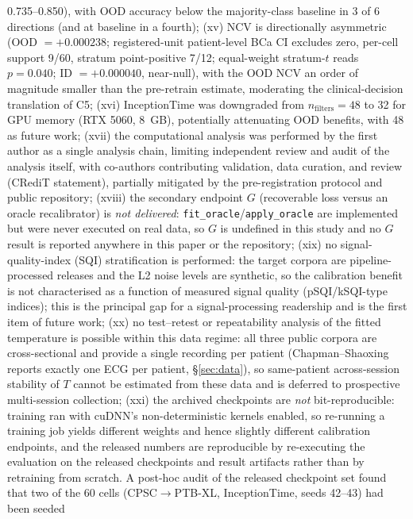 \documentclass[final,5p,times,nonatbib]{elsarticle}
\begin{document}
0.735--0.850), with OOD accuracy
below the majority-class baseline in 3 of 6 directions (and at baseline
in a fourth);
(xv) NCV is directionally asymmetric (OOD $= +0.000238$; registered-unit
patient-level BCa CI excludes zero, per-cell support 9/60, stratum
point-positive 7/12; equal-weight stratum-$t$ reads $p=0.040$;
ID $= +0.000040$, near-null), with the OOD NCV an order of
magnitude smaller than the pre-retrain estimate, moderating the
clinical-decision translation of C5; (xvi)
InceptionTime was downgraded from $n_{\text{filters}}=48$ to 32 for GPU
memory (RTX 5060, 8~GB), potentially attenuating OOD benefits, with 48
as future work; (xvii) the computational analysis was performed by the first
author as a single analysis chain, limiting independent review and
audit of the analysis itself, with co-authors contributing validation,
data curation, and review (CRediT statement), partially mitigated by
the pre-registration protocol and public repository; (xviii) the secondary
endpoint $G$ (recoverable loss versus an oracle recalibrator) is
\emph{not delivered}: \texttt{fit\_oracle}/\texttt{apply\_oracle} are
implemented but were never executed on real data, so $G$ is undefined in
this study and no $G$ result is reported anywhere in this paper or the
repository; (xix) no signal-quality-index (SQI) stratification is
performed: the target corpora are pipeline-processed releases and the L2
noise levels are synthetic, so the calibration benefit is not
characterised as a function of measured signal quality
(pSQI/kSQI-type indices); this is the principal gap for a
signal-processing readership and is the first item of future work;
(xx) no test--retest or repeatability analysis of the fitted temperature
is possible within this data regime: all three public corpora are
cross-sectional and provide a single recording per patient
(Chapman--Shaoxing reports exactly one ECG per patient, \S\ref{sec:data}),
so same-patient across-session stability of $T$ cannot be estimated from
these data and is deferred to prospective multi-session collection;
(xxi) the archived checkpoints are \emph{not} bit-reproducible: training
ran with cuDNN's non-deterministic kernels enabled, so re-running a
training job yields different weights and hence slightly different
calibration endpoints, and the released numbers are reproducible by
re-executing the evaluation on the released checkpoints and result
artifacts rather than by retraining from scratch. A post-hoc audit of the
released checkpoint set found that two of the 60 cells
(CPSC$\rightarrow$PTB-XL, InceptionTime, seeds 42--43) had been seeded
\end{document}
